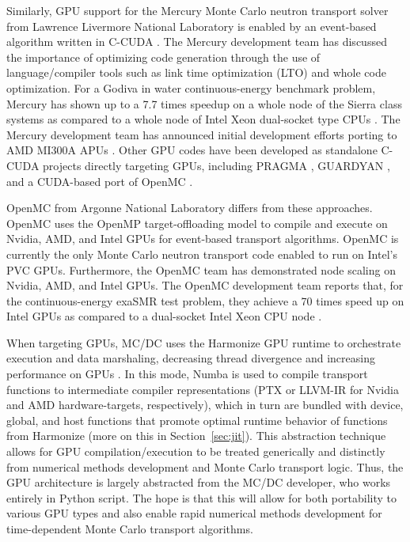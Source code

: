 Similarly, GPU support for the Mercury Monte Carlo neutron transport solver from Lawrence Livermore National Laboratory is enabled by an event-based algorithm written in C-CUDA \cite{pozulp_progress_2023}.
The Mercury development team has discussed the importance of optimizing code generation through the use of language/compiler tools such as link time optimization (LTO) and whole code optimization.
For a Godiva in water continuous-energy benchmark problem, Mercury has shown up to a 7.7 times speedup on a whole node of the Sierra class systems as compared to a whole node of Intel Xeon dual-socket type CPUs \cite{pozulp_progress_2023}.
The Mercury development team has announced initial development efforts porting to AMD MI300A APUs \cite{pozulp_sna_2024}.
Other GPU codes have been developed as standalone C-CUDA projects directly targeting GPUs, including PRAGMA \cite{choi_optimization_2021}, GUARDYAN \cite{molnar_gpu_based_2019}, and a CUDA-based port of OpenMC \cite{ridley2021}.

OpenMC from Argonne National Laboratory differs from these approaches.
OpenMC uses the OpenMP target-offloading model to compile and execute on Nvidia, AMD, and Intel GPUs for event-based transport algorithms.
OpenMC is currently the only Monte Carlo neutron transport code enabled to run on Intel's PVC GPUs.
Furthermore, the OpenMC team has demonstrated node scaling on Nvidia, AMD, and Intel GPUs.
The OpenMC development team reports that, for the continuous-energy exaSMR test problem, they achieve a 70 times speed up on Intel GPUs as compared to a dual-socket Intel Xeon CPU node \cite{tramm2024performanceportablemontecarlo}.

When targeting GPUs, MC/DC uses the Harmonize GPU runtime to orchestrate execution and data marshaling, decreasing thread divergence and increasing performance on GPUs \cite{brax2023}.
In this mode, Numba is used to compile transport functions to intermediate compiler representations (PTX or LLVM-IR for Nvidia and AMD hardware-targets, respectively), which in turn are bundled with device, global, and host functions that promote optimal runtime behavior of functions from Harmonize (more on this in Section~\ref{sec:jit}).
This abstraction technique allows for GPU compilation/execution to be treated generically and distinctly from numerical methods development and Monte Carlo transport logic.
Thus, the GPU architecture is largely abstracted from the MC/DC developer, who works entirely in Python script.
The hope is that this will allow for both portability to various GPU types and also enable rapid numerical methods development for time-dependent Monte Carlo transport algorithms.

